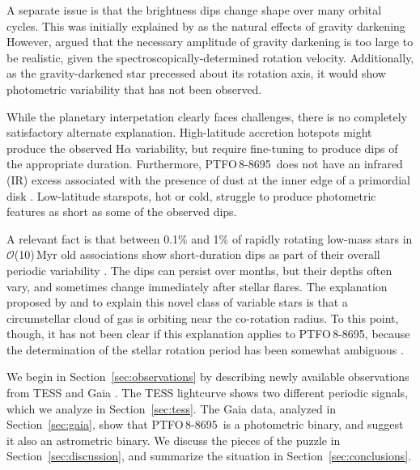\documentclass[12pt,twocolumn,tighten]{aastex62}
\newcommand{\ptfo}{PTFO$\,$8-8695}
\begin{document}
A separate issue is that the brightness dips
change shape over many orbital cycles. This was initially explained by
\cite{barnes_measurement_2013} as the natural effects of gravity darkening
However, \cite{howarth_reappraisal_2016} argued
that the necessary amplitude of gravity darkening is too large to be realistic, given the
spectroscopically-determined rotation velocity.
Additionally, as the
gravity-darkened star precessed about its rotation axis, it would 
show photometric variability that has not been observed.

While the planetary interpetation clearly faces challenges,
there is no completely satisfactory alternate explanation.  High-latitude accretion hotspots
might produce the observed H$\alpha$ variability, but require
fine-tuning to produce dips of the appropriate duration. Furthermore,
\ptfo\ does not have an infrared (IR) excess associated with the
presence of dust at the inner edge of a primordial disk \citep[{\it
e.g.},][Figure~18]{yu_tests_2015}.  Low-latitude starspots, hot or
cold, struggle to produce photometric features as short as some
of the observed dips.

A relevant fact is that between 0.1\% and 1\% of rapidly
rotating low-mass stars in $\mathcal{O}$(10)$\,$Myr old associations
show short-duration dips as part of their overall periodic variability
\citep{rebull_usco_2018}.  The dips can persist over months, but their
depths often vary, and sometimes change immediately after stellar
flares.  The explanation proposed by \citet{stauffer_orbiting_2017}
and \citet{david_transient_2017} to explain this novel class of
variable stars is that a circumstellar cloud of gas is orbiting
near the co-rotation radius.  To this point, though, it has not
been clear if this explanation applies to
\ptfo, because the determination of
the stellar rotation period has been somewhat ambiguous
\citep{van_eyken_ptf_2012,koen_multicolour_2015,raetz_yeti_2016}.

We begin in Section~\ref{sec:observations} by describing newly
available observations from TESS \citep{ricker_transiting_2015} and
Gaia \citep{gaia_collaboration_gaia_2018}.  The TESS lightcurve shows
two different periodic signals, which we analyze in
Section~\ref{sec:tess}.
The Gaia data, analyzed in Section~\ref{sec:gaia}, show that
\ptfo\ is a photometric binary, and suggest it also an astrometric binary.
We discuss the pieces of the puzzle
in Section~\ref{sec:discussion}, and summarize the situation in
Section~\ref{sec:conclusions}.
\end{document}
